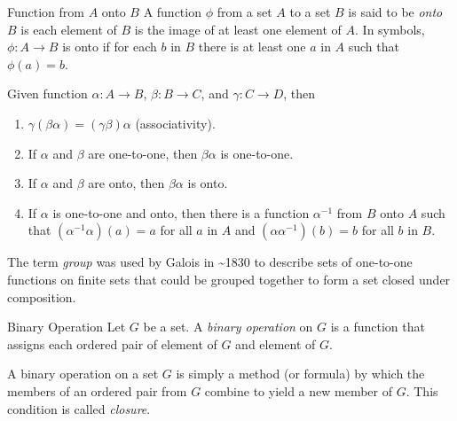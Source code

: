 \documentclass[../butidigress.tex]{subfiles}
\begin{document}
\begin{definition}{Function from $A$ onto $B$}
A function $\phi$ from a set $A$ to a set $B$ is said to be \emph{onto} $B$ is each element of $B$ is the image of at least one element of $A$.
In symbols, $\phi : A\rightarrow B$ is onto if for each $b$ in $B$ there is at least one $a$ in $A$ such that $\phi(a) = b$.
\end{definition}

\begin{theorem}
Given function $\alpha:A\rightarrow B$, $\beta:B\rightarrow C$, and $\gamma:C\rightarrow D$, then
\begin{enumerate}\mathlist
    \item $\gamma(\beta\alpha) = (\gamma\beta)\alpha$ (associativity).
    \item If $\alpha$ and $\beta$ are one-to-one, then $\beta\alpha$ is one-to-one.
    \item If $\alpha$ and $\beta$ are onto, then $\beta\alpha$ is onto.
    \item If $\alpha$ is one-to-one and onto, then there is a function $\alpha^{-1}$ from $B$ onto $A$ such that $(\alpha^{-1}\alpha)(a) = a$ for all $a$ in $A$ and $(\alpha\alpha^{-1})(b) = b$ for all $b$ in $B$.
\end{enumerate}
\end{theorem}

The term \emph{group} was used by Galois in \~{}1830 to describe sets of one-to-one functions on finite sets that could be grouped together to form a set closed under composition.


\begin{definition}{Binary Operation}
Let $G$ be a set.
A \emph{binary operation} on $G$ is a function that assigns each ordered pair of element of $G$ and element of $G$.
\end{definition}

A binary operation on a set $G$ is simply a method (or formula) by which the members of an ordered pair from $G$ combine to yield a new member of $G$.
This condition is called \emph{closure}.
\end{document}
